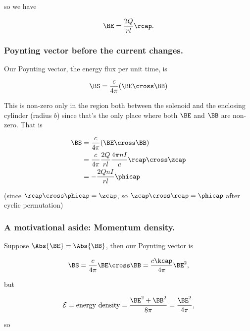 so we have

\begin{equation}\label{eqn:relativisticElectrodynamicsT5:150}
\BE = \frac{2 Q }{r l} \rcap.
\end{equation}

\subsubsection{Poynting vector before the current changes.}

Our Poynting vector, the energy flux per unit time, is

\begin{equation}\label{eqn:relativisticElectrodynamicsT5:151}
\BS = \frac{c}{4 \pi} (\BE \cross \BB)
\end{equation}

This is non-zero only in the region both between the solenoid and the enclosing cylinder (radius $b$) since that's the only place where both $\BE$ and $\BB$ are non-zero.  That is

\begin{align*}
\BS &= \frac{c}{4 \pi} (\BE \cross \BB) \\
&=
\frac{c}{4 \pi} \frac{2 Q }{r l} \frac{4 \pi n I}{c} \rcap \cross \zcap \\
&= -\frac{2 Q n I}{r l} \phicap
\end{align*}

(since $\rcap \cross \phicap = \zcap$, so $\zcap \cross \rcap = \phicap$ after cyclic permutation)

\subsubsection{A motivational aside:  Momentum density.}

Suppose $\Abs{\BE} = \Abs{\BB}$, then our Poynting vector is

\begin{equation}\label{eqn:relativisticElectrodynamicsT5:170}
\BS = \frac{c}{4 \pi} \BE \cross \BB = \frac{ c \kcap}{4 \pi} \BE^2,
\end{equation}

but

\begin{equation}\label{eqn:relativisticElectrodynamicsT5:190}
\mathcal{E} = \text{energy density} = \frac{\BE^2 + \BB^2}{8 \pi} = \frac{\BE^2}{4 \pi},
\end{equation}

so

